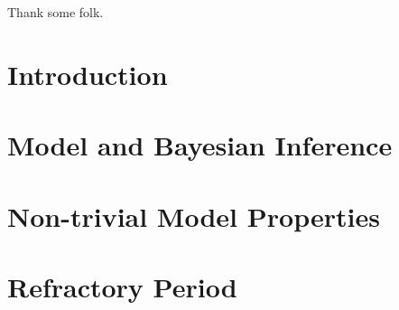 \documentclass[oneside, 12 pt]{book}
\begin{document}
\newpage


 \vspace{3cm}
 
 
 \\ \\
Thank some folk.

\tableofcontents
\listoffigures
\listoftables
\mainmatter
\pagestyle{fancy}
\chapter{Introduction}
 
 
\chapter{Model and Bayesian Inference}\label{chapter 2}
 


\chapter{Non-trivial Model Properties}\label{chapter 3}



\chapter{Refractory Period}\label{chapter 4}


\end{document}
